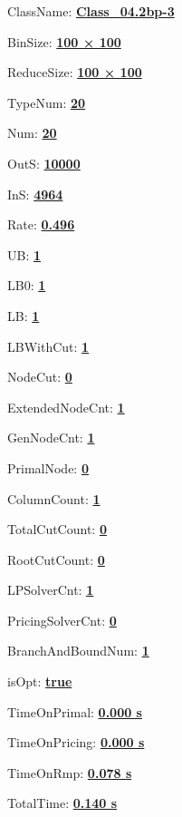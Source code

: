 \documentclass[11pt]{article}
\begin{document}
\pagestyle{empty}


ClassName: \underline{\textbf{Class_04.2bp-3}}
\par
BinSize: \underline{\textbf{100 × 100}}
\par
ReduceSize: \underline{\textbf{100 × 100}}
\par
TypeNum: \underline{\textbf{20}}
\par
Num: \underline{\textbf{20}}
\par
OutS: \underline{\textbf{10000}}
\par
InS: \underline{\textbf{4964}}
\par
Rate: \underline{\textbf{0.496}}
\par
UB: \underline{\textbf{1}}
\par
LB0: \underline{\textbf{1}}
\par
LB: \underline{\textbf{1}}
\par
LBWithCut: \underline{\textbf{1}}
\par
NodeCut: \underline{\textbf{0}}
\par
ExtendedNodeCnt: \underline{\textbf{1}}
\par
GenNodeCnt: \underline{\textbf{1}}
\par
PrimalNode: \underline{\textbf{0}}
\par
ColumnCount: \underline{\textbf{1}}
\par
TotalCutCount: \underline{\textbf{0}}
\par
RootCutCount: \underline{\textbf{0}}
\par
LPSolverCnt: \underline{\textbf{1}}
\par
PricingSolverCnt: \underline{\textbf{0}}
\par
BranchAndBoundNum: \underline{\textbf{1}}
\par
isOpt: \underline{\textbf{true}}
\par
TimeOnPrimal: \underline{\textbf{0.000 s}}
\par
TimeOnPricing: \underline{\textbf{0.000 s}}
\par
TimeOnRmp: \underline{\textbf{0.078 s}}
\par
TotalTime: \underline{\textbf{0.140 s}}
\par
\newpage
\end{document}
